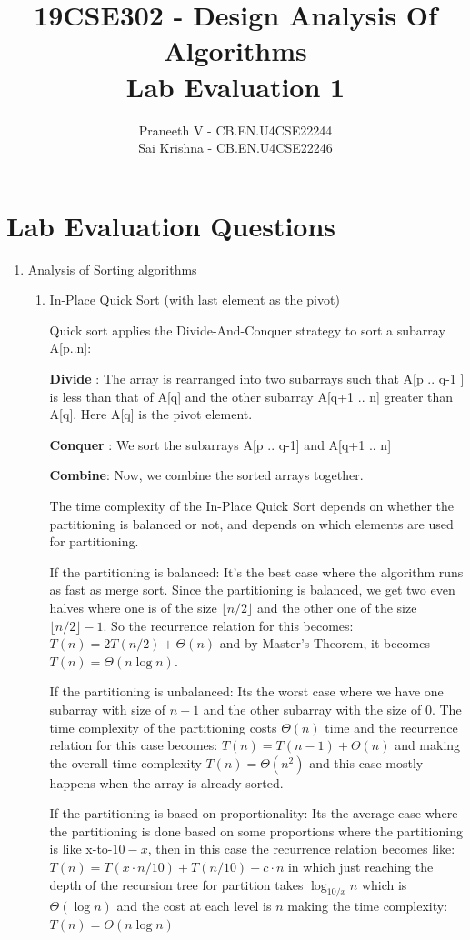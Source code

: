 \documentclass{article}
\title{19CSE302 - Design Analysis Of Algorithms \\ Lab Evaluation 1}
\author{Praneeth V - CB.EN.U4CSE22244 \\ Sai Krishna - CB.EN.U4CSE22246}
\begin{document}
\maketitle

\section*{Lab Evaluation Questions}

\begin{enumerate}
    \item Analysis of Sorting algorithms
    \begin{enumerate}[label*=\arabic*.]
        \item In-Place Quick Sort (with last element as the pivot)

        Quick sort applies the Divide-And-Conquer strategy to sort a subarray A[p..n]:


        \textbf{Divide} : The array is rearranged into two subarrays such that A[p .. q-1 ] is less than that of A[q] and the other subarray A[q+1 .. n] 
        greater than A[q]. Here A[q] is the pivot element.

        \textbf{Conquer} : We sort the subarrays A[p .. q-1] and A[q+1 .. n]

        \textbf{Combine}: Now, we combine the sorted arrays together. 

        The time complexity of the In-Place Quick Sort depends on whether the partitioning is balanced or not, and depends on which elements are used for partitioning. 

        If the partitioning is balanced: It's the best case where the algorithm runs as fast as merge sort. Since the partitioning is balanced, we get two even halves where one is of the size \( \lfloor n/2 \rfloor \) and the other one of the size \( \lfloor n/2 \rfloor - 1 \). So the recurrence relation for this becomes: \( T(n) = 2 T(n/2) + \Theta(n) \) and by Master's Theorem, it becomes \( T(n) = \Theta(n \log n) \). 

        If the partitioning is unbalanced: Its the worst case where we have one subarray with size of \( n-1 \) and the other subarray with the size of 0. The time complexity of the partitioning costs \( \Theta(n) \) time and the recurrence relation for this case becomes:
        \( T(n) = T(n - 1) + \Theta(n) \) and making the overall time complexity \( T(n) = \Theta(n^2) \) and this case mostly happens when the array is already sorted. 

        If the partitioning is based on proportionality: Its the average case where the partitioning is done based on some proportions where the partitioning is like x-to-\(10-x\), then in this case the recurrence relation becomes like: \( T(n) = T(x \cdot n/10) + T(n/10) + c \cdot n \) in which just reaching the depth of the recursion tree for partition takes \( \log_{10/x} n \) which is \( \Theta(\log n) \) and the cost at each level is \( n \) making the time complexity: \( T(n) = O(n \log n) \)


\end{enumerate}
\end{enumerate}
\end{document}
